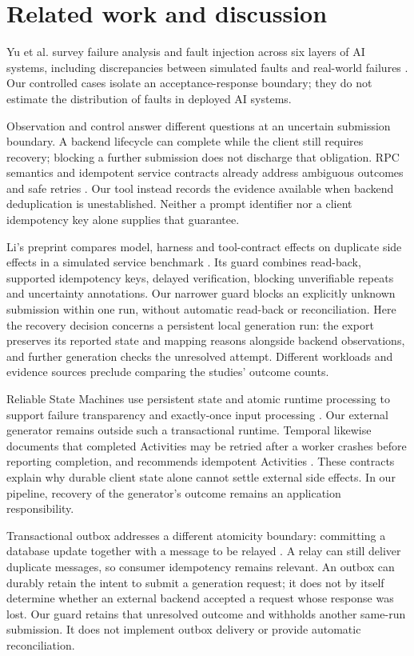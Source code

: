 \documentclass{ieeeaccess}
\begin{document}
\section{Related work and discussion}
\label{sec:related}

Yu et al. survey failure analysis and fault injection across six layers of AI
systems, including discrepancies between simulated faults and real-world
failures \cite{yu2025survey}. Our controlled cases isolate an acceptance-response
boundary; they do not estimate the distribution of faults in deployed AI systems.

Observation and control answer different questions at an uncertain submission
boundary. A backend lifecycle can complete while the client still requires
recovery; blocking a further submission does not discharge that obligation.
RPC semantics and idempotent service contracts already address ambiguous
outcomes and safe retries \cite{birrell1984,aws}. Our tool instead records the
evidence available when backend deduplication is unestablished. Neither a
prompt identifier nor a client idempotency key alone supplies that guarantee.

Li's preprint compares model, harness and tool-contract effects on duplicate
side effects in a simulated service benchmark \cite{li2026exactlyonce}. Its
guard combines read-back, supported idempotency keys, delayed verification,
blocking unverifiable repeats and uncertainty annotations. Our narrower guard
blocks an explicitly unknown submission within one run, without automatic
read-back or reconciliation. Here the recovery decision concerns a persistent
local generation run: the export preserves its reported state and mapping
reasons alongside backend observations, and further generation checks the
unresolved attempt. Different
workloads and evidence sources preclude comparing the studies' outcome counts.

Reliable State Machines use persistent state and atomic runtime processing
to support failure transparency and exactly-once input processing
\cite{rsm2019}. Our external generator remains outside such a transactional
runtime. Temporal likewise documents that completed Activities may be retried
after a worker crashes before reporting completion, and recommends idempotent
Activities \cite{temporal}. These contracts explain why durable client state
alone cannot settle external side effects. In our pipeline, recovery of the
generator's outcome remains an application responsibility.

Transactional outbox addresses a different atomicity boundary: committing a
database update together with a message to be relayed \cite{outbox}. A relay
can still deliver duplicate messages, so consumer idempotency remains relevant.
An outbox can durably retain the intent to submit a generation request; it does
not by itself determine whether an external backend accepted a request whose
response was lost. Our guard retains that unresolved outcome and withholds
another same-run submission. It does not implement outbox delivery or provide
automatic reconciliation.
\end{document}
